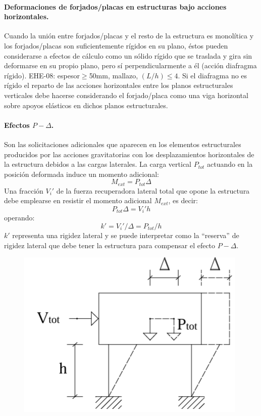 \paragraph{Deformaciones de forjados/placas en estructuras bajo acciones horizontales.}
Cuando la unión entre forjados/placas y el resto de la estructura es monolítica y los forjados/placas son suficientemente rígidos en su plano, éstos pueden considerarse a efectos de cálculo como un sólido rígido que se traslada y gira sin deformarse en su propio plano, pero sí perpendicularmente a él (acción diafragma rígido). EHE-08: espesor$\geq$50mm, mallazo, $(L/h)\leq4$. Si el diafragma no es rígido el reparto de las acciones horizontales entre los planos estructurales verticales debe hacerse considerando el forjado/placa como una viga horizontal sobre apoyos elásticos en dichos planos estructurales.

\paragraph{Efectos $P-\Delta$.}
Son las solicitaciones adicionales que aparecen en los elementos estructurales producidos por las acciones gravitatorias con los desplazamientos horizontales de la estructura debidos a las cargas laterales. La carga vertical $P_{tot}$ actuando en la posición deformada induce un momento adicional:
\begin{equation}
    M_{ext} = P_{tot} \Delta
\end{equation}
Una fracción $V_i'$ de la fuerza recuperadora lateral total que opone la estructura debe emplearse en resistir el momento adicional $M_{ext}$, es decir:
\begin{equation}
    P_{tot} \Delta = V_i' h
\end{equation}
operando:
\begin{equation}
    k' = V_i'/ \Delta = P_{tot} / h
\end{equation}
$k'$ representa una rigidez lateral y se puede interpretar como la ``reserva'' de rigidez lateral que debe tener la estructura para compensar el efecto $P-\Delta$.

\begin{figure}[H]
    \centering
    \includegraphics[width=0.5\linewidth]{Imagenes/Efecto P Delta.png}
\end{figure}


